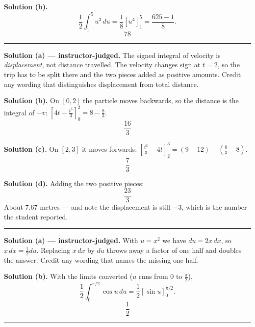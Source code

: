 \documentclass[12pt]{article}
\begin{document}
\textbf{Solution (b).}
\[ \frac{1}{2}\int_1^{5} u^3\,du = \frac{1}{8}\left[u^4\right]_1^{5}
   = \frac{625 - 1}{8}. \]
\[ \boxed{78} \]

\vspace{0.15cm}\noindent\rule{\linewidth}{0.2pt}


\textbf{Solution (a) --- instructor-judged.} The signed integral of velocity is
\emph{displacement}, not distance travelled. The velocity changes sign at
$t = 2$, so the trip has to be split there and the two pieces added as positive
amounts. Credit any wording that distinguishes displacement from total distance.

\textbf{Solution (b).} On $[0,2]$ the particle moves backwards, so the distance
is the integral of $-v$: $\left[4t - \tfrac{t^3}{3}\right]_0^2 = 8 - \tfrac{8}{3}$.
\[ \boxed{\frac{16}{3}} \]

\textbf{Solution (c).} On $[2,3]$ it moves forwards:
$\left[\tfrac{t^3}{3} - 4t\right]_2^3 = (9 - 12) - \left(\tfrac{8}{3} - 8\right)$.
\[ \boxed{\frac{7}{3}} \]

\textbf{Solution (d).} Adding the two positive pieces:
\[ \boxed{\frac{23}{3}} \]
About $7.67$ metres --- and note the displacement is still $-3$, which is the
number the student reported.

\vspace{0.15cm}\noindent\rule{\linewidth}{0.2pt}


\textbf{Solution (a) --- instructor-judged.} With $u = x^2$ we have
$du = 2x\,dx$, so $x\,dx = \tfrac{1}{2}du$. Replacing $x\,dx$ by $du$ throws
away a factor of one half and doubles the answer. Credit any wording that names
the missing one half.

\textbf{Solution (b).} With the limits converted ($u$ runs from $0$ to
$\tfrac{\pi}{2}$),
\[ \frac{1}{2}\int_0^{\pi/2}\cos u\,du = \frac{1}{2}\left[\sin u\right]_0^{\pi/2}. \]
\[ \boxed{\frac{1}{2}} \]

\vspace{0.15cm}\noindent\rule{\linewidth}{0.2pt}

\end{document}
